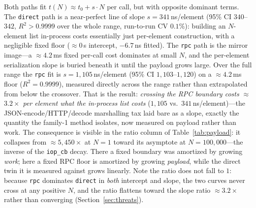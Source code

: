 \documentclass[conference]{IEEEtran}
\newcommand{\code}[1]{\texttt{#1}}
\begin{document}
Both paths fit $t(N)\approx t_0 + s\cdot N$ per call, but with opposite dominant
terms. The \code{direct} path is a near-perfect line of slope $s=341$\,ns/element
(95\% CI $340$--$342$, $R^2>0.9999$ over the whole range, run-to-run CV $0.1\%$):
building an $N$-element list in-process costs essentially just per-element
construction, with a negligible fixed floor ($\approx$$0$\,\textmu s intercept,
$-6.7$\,ns fitted). The \code{rpc} path is the mirror
image---a $\approx$$4.2$\,ms fixed per-call cost dominates at small $N$, and the
per-element serialization slope is buried beneath it until the payload grows
large. Over the full range the \code{rpc} fit is $s=1{,}105$\,ns/element (95\% CI
$1{,}103$--$1{,}120$) on a $\approx$$4.2$\,ms floor ($R^2=0.9999$), measured directly
across the range rather than extrapolated from below the crossover. That is
the result: \emph{crossing the RPC boundary costs $\approx$$3.2\times$ per element
what the in-process list costs} ($1{,}105$ vs.\ $341$\,ns/element)---the
JSON-encode/HTTP/decode marshalling tax laid bare as a slope, exactly the quantity
the family-1 method isolates, now measured on payload rather than work. The
consequence is visible in the ratio column of Table~\ref{tab:payload}: it
collapses from $\approx$$5{,}450\times$ at $N{=}1$ toward its asymptote at
$N{=}100{,}000$---the inverse of the \code{iop\_cb} decay. There a fixed boundary was amortized by
growing \emph{work}; here a fixed RPC floor is amortized by growing \emph{payload},
while the direct twin it is measured against grows linearly. Note the ratio
does not fall to $1$: because \code{rpc} dominates \code{direct} in \emph{both}
intercept and slope, the two curves never cross at any positive $N$, and the
ratio flattens toward the slope ratio $\approx$$3.2\times$ rather than converging
(Section~\ref{sec:threats}).
\end{document}
